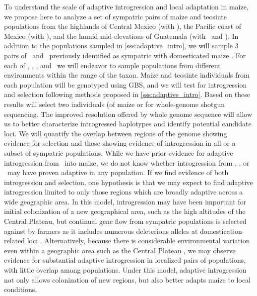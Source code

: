 To understand the scale of adaptive introgression and local adaptation in maize, we propose here to analyze a set of sympatric pairs of maize and teosinte populations from the highlands of Central Mexico (with \zm), the Pacific coast of Mexico (with \zp), and the humid mid-elevations of Guatemala (with \zl\ and \zh). 
In addition to the populations sampled in \ref{sss:adaptive_intro}, we will sample 3 pairs of \zm\ and \zp\ previously identified as sympatric with domesticated maize \citep{hufford2010genetic, Hufford2013}.  
For each of \zl, \zm, \zp, and \zh\ we will endeavor to sample populations from different environments within the range of the taxon.
Maize and teosinte individuals from each population will be genotyped using GBS, and we will test for introgression and selection following methods proposed in \ref{sss:adaptive_intro}.
Based on these results will select two individuals (of maize or \zm\) for whole-genome shotgun sequencing. 
The improved resolution offered by whole genome sequence will allow us to better characterize introgressed haplotypes and identify potential candidate loci.
We will quantify the overlap between regions of the genome showing evidence for selection and those showing evidence of introgression in all or a subset of sympatric populations.  
While we have prior evidence for adaptive introgression from \zm\ into maize, we do not know whether introgression from \zp, \zl, or \zh\ may have proven adaptive in any population.
If we find evidence of both introgression and selection, one hypothesis is that we may expect to find adaptive introgression limited to only those regions which are broadly adaptive across a wide geographic area. 
In this model, introgression may have been important for initial colonization of a new geographical area, such as the high altitudes of the Central Plateau, but continual gene flow from sympatric populations is selected against by farmers as it includes numerous deleterious alleles at domestication-related loci \citep[c.f.][]{Hufford2013}.
Alternatively, because there is considerable environmental variation even within a geographic area such as the Central Plateau \citep{hufford2012inferences, Pyhajarvi2013}, we may observe evidence for substantial adaptive introgression in localized pairs of populations, with little overlap among populations. 
Under this model, adaptive introgression not only allows colonization of new regions, but also better adapts maize to local conditions.

